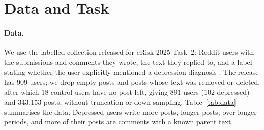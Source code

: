 \documentclass[11pt]{article}
\begin{document}
\section{Data and Task}

\paragraph{Data.}
We use the labelled collection released for eRisk 2025 Task~2: Reddit users with the submissions and comments they wrote, the text they replied to, and a label stating whether the user explicitly mentioned a depression diagnosis \citep{parapar2025overview}.
The release has 909 users; we drop empty posts and posts whose text was removed or deleted, after which 18 control users have no post left, giving 891 users (102 depressed) and 343{,}153 posts, without truncation or down-sampling.
Table~\ref{tab:data} summarises the data.
Depressed users write more posts, longer posts, over longer periods, and more of their posts are comments with a known parent text.

\begin{table}[t]
\centering\footnotesize
{}
\caption{Data. ``Self-report phrase'': at least one post matching a first-person pattern such as ``I was diagnosed with depression'' (Appendix~\ref{app:sr}).}
\label{tab:data}
\end{table}
\end{document}
